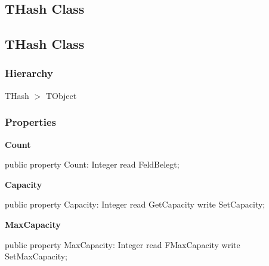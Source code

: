 \documentclass{report}
\newif\ifpdf
\begin{document}
\subsection*{\large{\textbf{THash Class}}\normalsize\hspace{1ex}\hrulefill}
\else
\subsection*{THash Class}
\fi
\label{PasDoc_Hashes.THash}
\subsubsection*{\large{\textbf{Hierarchy}}\normalsize\hspace{1ex}\hfill}
THash {$>$} TObject
\subsubsection*{\large{\textbf{Properties}}\normalsize\hspace{1ex}\hfill}
\begin{list}{}{
\setlength{\itemindent}{0cm}
\setlength{\listparindent}{0cm}
\setlength{\leftmargin}{\evensidemargin}
\addtolength{\leftmargin}{\tmplength}
\settowidth{\labelsep}{X}
\addtolength{\leftmargin}{\labelsep}
\setlength{\labelwidth}{\tmplength}
}
\label{PasDoc_Hashes.THash-Count}
\item[\textbf{Count}\hfill]
\ifpdf
\begin{flushleft}
\fi
\begin{ttfamily}
public property Count: Integer read FeldBelegt;\end{ttfamily}

\ifpdf
\end{flushleft}
\fi


\par  \label{PasDoc_Hashes.THash-Capacity}
\item[\textbf{Capacity}\hfill]
\ifpdf
\begin{flushleft}
\fi
\begin{ttfamily}
public property Capacity: Integer read GetCapacity write SetCapacity;\end{ttfamily}

\ifpdf
\end{flushleft}
\fi


\par  \label{PasDoc_Hashes.THash-MaxCapacity}
\item[\textbf{MaxCapacity}\hfill]
\ifpdf
\begin{flushleft}
\fi
\begin{ttfamily}
public property MaxCapacity: Integer read FMaxCapacity write SetMaxCapacity;\end{ttfamily}

\ifpdf
\end{flushleft}
\fi


\par  \end{list}
\end{document}
